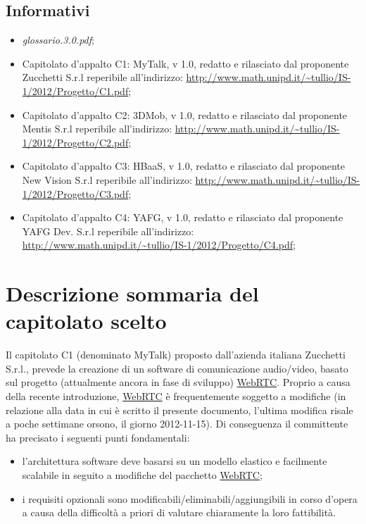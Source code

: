 \subsection{Informativi}
\begin{itemize}
\item[] \textit{glossario.3.0.pdf};
\item[] Capitolato d'appalto C1: MyTalk, v 1.0, redatto e rilasciato dal proponente Zucchetti S.r.l reperibile all'indirizzo: \url{http://www.math.unipd.it/~tullio/IS-1/2012/Progetto/C1.pdf};
\item[] Capitolato d'appalto C2: 3DMob, v 1.0, redatto e rilasciato dal proponente Mentis S.r.l reperibile all'indirizzo: \url{http://www.math.unipd.it/~tullio/IS-1/2012/Progetto/C2.pdf};
\item[] Capitolato d'appalto C3: HBaaS, v 1.0, redatto e rilasciato dal proponente New Vision S.r.l reperibile all'indirizzo: \url{http://www.math.unipd.it/~tullio/IS-1/2012/Progetto/C3.pdf};
\item[] Capitolato d'appalto C4: YAFG, v 1.0, redatto e rilasciato dal proponente YAFG Dev. S.r.l reperibile all'indirizzo: \url{http://www.math.unipd.it/~tullio/IS-1/2012/Progetto/C4.pdf};
\end{itemize}
\clearpage
\section{Descrizione sommaria del capitolato scelto}
Il capitolato C1 (denominato MyTalk) proposto dall'azienda italiana Zucchetti S.r.l., prevede la creazione di un software di comunicazione audio/video, basato sul progetto (attualmente ancora in fase di sviluppo) \underline{WebRTC}. Proprio a causa della recente introduzione, \underline{WebRTC} è frequentemente soggetto a modifiche (in relazione alla data in cui è scritto il presente documento, l'ultima modifica risale a poche settimane orsono, il giorno 2012-11-15). Di conseguenza il committente ha precisato i seguenti punti fondamentali:

\begin{itemize}
	\item l'architettura software deve basarsi su un modello elastico e facilmente scalabile in seguito a modifiche del pacchetto \underline{WebRTC};
	\item i requisiti opzionali sono modificabili/eliminabili/aggiungibili in corso d'opera a causa della difficoltà a priori di valutare chiaramente la loro fattibilità.
\end{itemize}

